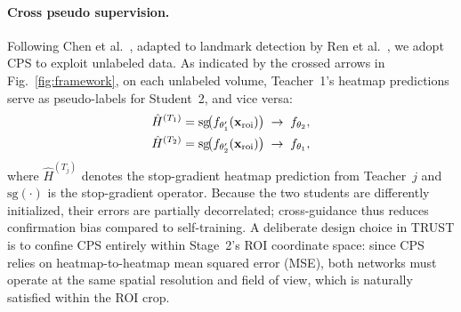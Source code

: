 \documentclass[conference]{IEEEtran}
\begin{document}
\paragraph{Cross pseudo supervision.}
Following Chen et al.~\cite{Chen2021_cps}, adapted to landmark detection by Ren et al.~\cite{Ren2024_g2lcps}, we adopt CPS to exploit unlabeled data. As indicated by the crossed arrows in Fig.~\ref{fig:framework}, on each unlabeled volume, Teacher~1's heatmap predictions serve as pseudo-labels for Student~2, and vice versa:
\begin{align}
  \hat{H}^{(T_1)} &= \mathrm{sg}\!\bigl(f_{\theta'_1}(\mathbf{x}_{\mathrm{roi}})\bigr) \;\to\; f_{\theta_2}, \notag\\
  \hat{H}^{(T_2)} &= \mathrm{sg}\!\bigl(f_{\theta'_2}(\mathbf{x}_{\mathrm{roi}})\bigr) \;\to\; f_{\theta_1},
  \label{eq:cps_scheme}
\end{align}
where $\hat{H}^{(T_j)}$ denotes the stop-gradient heatmap prediction from Teacher~$j$ and $\mathrm{sg}(\cdot)$ is the stop-gradient operator. Because the two students are differently initialized, their errors are partially decorrelated; cross-guidance thus reduces confirmation bias compared to self-training. A deliberate design choice in TRUST is to confine CPS entirely within Stage~2's ROI coordinate space: since CPS relies on heatmap-to-heatmap mean squared error (MSE), both networks must operate at the same spatial resolution and field of view, which is naturally satisfied within the ROI crop.
\end{document}
